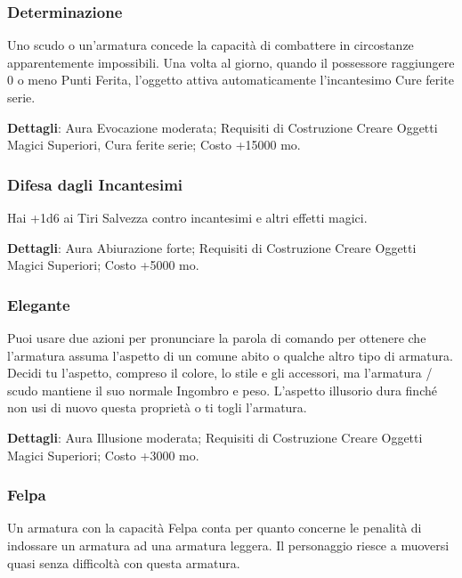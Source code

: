 \begin{multicols}{2}
\subsubsection*{Determinazione}

Uno scudo o un'armatura concede la capacità di combattere in circostanze apparentemente impossibili. Una volta al giorno, quando il possessore raggiungere 0 o meno Punti Ferita, l'oggetto attiva automaticamente l'incantesimo Cure ferite serie.

\textbf{Dettagli}: Aura Evocazione moderata; Requisiti di Costruzione Creare Oggetti Magici Superiori, Cura ferite serie; Costo +15000 mo.

\subsubsection*{Difesa dagli Incantesimi}

Hai +1d6 ai Tiri Salvezza contro incantesimi e altri effetti magici.

\textbf{Dettagli}: Aura Abiurazione forte; Requisiti di Costruzione Creare Oggetti Magici Superiori; Costo +5000 mo.

\subsubsection*{Elegante}

Puoi usare due azioni per pronunciare la parola di comando per ottenere che l'armatura assuma l'aspetto di un comune abito o qualche altro tipo di armatura. Decidi tu l'aspetto, compreso il colore, lo stile e gli accessori, ma l'armatura / scudo mantiene il suo normale Ingombro e peso. L'aspetto illusorio dura finché non usi di nuovo questa proprietà o ti togli l'armatura.

\textbf{Dettagli}: Aura Illusione moderata; Requisiti di Costruzione Creare Oggetti Magici Superiori; Costo +3000 mo.


\subsubsection*{Felpa}

Un armatura con la capacità Felpa conta per quanto concerne le penalità di indossare un armatura ad una armatura leggera. Il personaggio riesce a muoversi quasi senza difficoltà con questa armatura.


\end{multicols}
